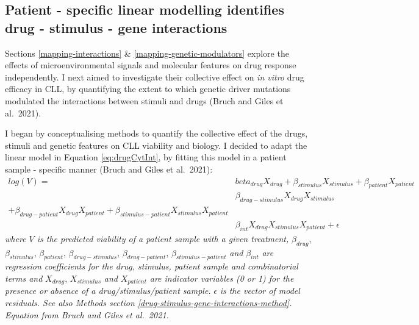 \documentclass[11pt, a4paper, twosided]{book}
\begin{document}
\hypertarget{patient---specific-linear-modelling-identifies-drug---stimulus---gene-interactions}{%
\subsection{Patient - specific linear modelling identifies drug - stimulus - gene interactions}\label{patient---specific-linear-modelling-identifies-drug---stimulus---gene-interactions}}

Sections \ref{mapping-interactions} \& \ref{mapping-genetic-modulators} explore the effects of microenvironmental signals and molecular features on drug response independently. I next aimed to investigate their collective effect on \emph{in vitro} drug efficacy in CLL, by quantifying the extent to which genetic driver mutations modulated the interactions between stimuli and drugs (Bruch and Giles et al.~2021).

I began by conceptualising methods to quantify the collective effect of the drugs, stimuli and genetic features on CLL viability and biology. I decided to adapt the linear model in Equation \eqref{eq:drugCytInt}, by fitting this model in a patient sample - specific manner (Bruch and Giles et al.~2021):
\begin{equation}
\begin{aligned}
log(V) ={} & beta_{drug}X_{drug} + \beta_{stimulus}X_{stimulus} + \beta_{patient}X_{patient} \\
           & \beta_{drug-stimulus}X_{drug}X_{stimulus} \\+ \beta_{drug-patient}X_{drug}X_{patient} + \beta_{stimulus-patient}X_{stimulus}X_{patient} \\
           & \beta_{int}X_{drug}X_{stimulus}X_{patient} + \epsilon
           \label{eq:drugCytGeneInt}
\end{aligned}
\end{equation}
\emph{where \(V\) is the predicted viability of a patient sample with a given treatment,} \(\beta_{drug}\), \(\beta_{stimulus}\), \(\beta_{patient}\), \(\beta_{drug-stimulus}\), \(\beta_{drug-patient}\), \(\beta_{stimulus-patient}\) \emph{and} \(\beta_{int}\) \emph{are regression coefficients for the drug, stimulus, patient sample and combinatorial terms and} \(X_{drug}\), \(X_{stimulus}\) \emph{and} \(X_{patient}\) \emph{are indicator variables (0 or 1) for the presence or absence of a drug/stimulus/patient sample.} \(\epsilon\) \emph{is the vector of model residuals. See also Methods section \ref{drug-stimulus-gene-interactions-method}. Equation from Bruch and Giles et al.~2021.}
\end{document}
